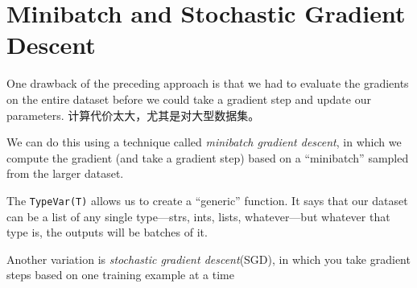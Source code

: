 \section{Minibatch and Stochastic Gradient Descent}
One drawback of the preceding approach is that we had to evaluate the gradients on the entire dataset before we could take a gradient step and update our parameters. 计算代价太大，尤其是对大型数据集。

We can do this using a technique called \emph{minibatch gradient descent}, in which we compute the gradient (and take a gradient step) based on a “minibatch” sampled from the larger dataset.

\begin{tcolorbox}
    The \verb|TypeVar(T)| allows us to create a “generic” function. It says that
    our dataset can be a list of any single type—strs, ints, lists,
    whatever—but whatever that type is, the outputs will be batches of
    it.
\end{tcolorbox}

Another variation is \emph{stochastic gradient descent}(SGD), in which you take gradient steps based on one training example at a time